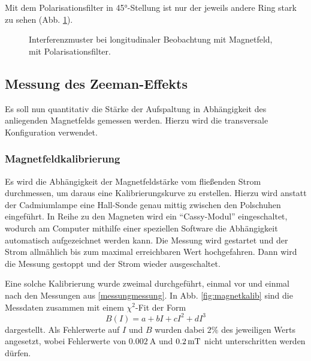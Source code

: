 \documentclass{article}
\begin{document}
\begin{multicols}{2}
Mit dem Polarisationsfilter in \ang{45}-Stellung ist nur der jeweils andere Ring stark zu sehen (Abb. \ref{fig:zeeman-longitudinal-mit-45}).
\begin{figure}[H]
  \centering
  \caption{Interferenzmuster bei longitudinaler Beobachtung mit Magnetfeld, mit Polarisationsfilter.}
  \label{fig:zeeman-longitudinal-mit-45}
\end{figure}


\subsection{Messung des Zeeman-Effekts}
Es soll nun quantitativ die Stärke der Aufspaltung in Abhängigkeit des anliegenden Magnetfelds gemessen werden.
Hierzu wird die transversale Konfiguration verwendet.

\subsubsection{Magnetfeldkalibrierung}
Es wird die Abhängigkeit der Magnetfeldstärke vom fließenden Strom durchmessen, um daraus eine Kalibrierungskurve zu erstellen.
Hierzu wird anstatt der Cadmiumlampe eine Hall-Sonde genau mittig zwischen den Polschuhen eingeführt.
In Reihe zu den Magneten wird ein \enquote{Cassy-Modul} eingeschaltet,
wodurch am Computer mithilfe einer speziellen Software die Abhängigkeit automatisch aufgezeichnet werden kann.
Die Messung wird gestartet und der Strom allmählich bis zum maximal erreichbaren Wert hochgefahren.
Dann wird die Messung gestoppt und der Strom wieder ausgeschaltet.

Eine solche Kalibrierung wurde zweimal durchgeführt, einmal vor und einmal nach den Messungen aus \ref{messungmessung}.
In Abb. \ref{fig:magnetkalib} sind die Messdaten zusammen mit einem $\chi^2$-Fit der Form
\[
  B(I) = a + bI + cI^2 + dI^3
\]
dargestellt. Als Fehlerwerte auf $I$ und $B$ wurden dabei $2\%$ des jeweiligen Werts angesetzt,
wobei Fehlerwerte von $\SI{0.002}{\A}$ und $\SI{0.2}{\mT}$ nicht unterschritten werden dürfen.


\end{multicols}
\end{document}
